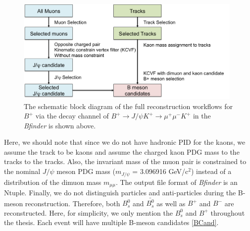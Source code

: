 \begin{figure}[h]
\begin{center}
\includegraphics[width= 0.98\textwidth]{Figures/Chapter5/BPmesonWorkflow.png}
\caption{The schematic block diagram of the full reconstruction workflows for $B^+$ via the decay channel of $B^+ \rightarrow J/\psi K^+ \rightarrow \mu^+\mu^- K^+$ in the \textit{Bfinder} is shown above.}
\label{BPRECOWF}
\end{center}
\end{figure}

Here, we should note that since we do not have hadronic PID for the kaons, we assume the track to be kaons and assume the charged kaon PDG mass to the tracks \cite{AlphaTheoEx} to the tracks. Also, the invariant mass of the muon pair is constrained to the nominal $J/\psi$ meson PDG mass ($m_{J/\psi}$ = 3.096916 GeV/c$^2$) \cite{AlphaTheoEx} instead of a distribution of the dimuon mass $m_{\mu\mu}$. The output file format of \textit{Bfinder} is an Ntuple. Finally, we do not distinguish particles and anti-particles during the B-meson reconstruction. Therefore, both $B^0_s$ and $\bar{B^0_s}$ as well as $B^+$ and $B^-$ are reconstructed. Here, for simplicity, we only mention the $B^0_s$ and $B^+$ throughout the thesis. Each event will have multiple B-meson candidates \ref{BCand}.

